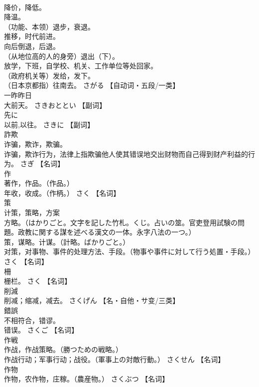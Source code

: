 \documentclass[8pt]{extreport}
\begin{document}
\begin{CJK}{UTF8}{min}
\\	降价，降低。 
\\	降温。 
\\	（功能、本领）退步，衰退。 
\\	推移，时代前进。 
\\	向后倒退，后退。 
\\	（从地位高的人的身旁）退出（下）。 
\\	放学，下班，自学校、机关、工作单位等处回家。 
\\	（政府机关等）发给，发下。 
\\	（日本京都指）往南去。	さがる		【自动词・五段/一类】
\\	一昨昨日	
\\	大前天。	さきおととい		【副词】
\\	先に	
\\	以前,以往。	さきに		【副词】
\\	詐欺	
\\	诈骗，欺诈，欺骗。 
\\	诈骗，欺诈行为，法律上指欺骗他人使其错误地交出财物而自己得到财产利益的行为。	さぎ		【名词】
\\	作	
\\	著作，作品。（作品。） 
\\	年收，收成。（作柄。）	さく		【名词】
\\	策	
\\	计策，策略，方案
\\	方略。（はかりごと。文字を記した竹札。くじ。占いの筮。官吏登用試験の問題。政教に関する謀を述べる漢文の一体。永字八法の一つ。） 
\\	策，谋略。计谋。（計略。ばかりごと。） 
\\	对策，对事物、事件的处理方法、手段。（物事や事件に対して行う処置・手段。）	さく		【名词】
\\	柵	
\\	栅栏。	さく		【名词】
\\	削減	
\\	削减；缩减，减去。	さくげん		【名・自他・サ变/三类】
\\	錯誤	
\\	不相符合，错谬。 
\\	错误。	さくご		【名词】
\\	作戦	
\\	作战，作战策略。（勝つための戦略。） 
\\	作战行动；军事行动；战役。（軍事上の対敵行動。）	さくせん		【名词】
\\	作物	
\\	作物，农作物，庄稼。（農産物。）	さくぶつ		【名词】

\end{CJK}
\end{document}
